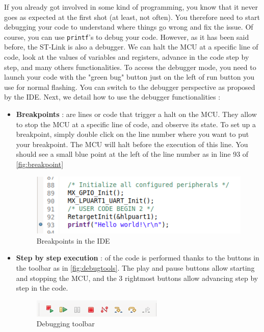 If you already got involved in some kind of programming, you know that it never goes as expected at the first shot (at least, not often). You therefore need to start debugging your code to understand where things go wrong and fix the issue. Of course, you can use \texttt{printf}'s to debug your code. However, as it has been said before, the ST-Link is also a debugger. We can halt the MCU at a specific line of code, look at the values of variables and registers, advance in the code step by step, and many others functionalities. To access the debugger mode, you need to launch your code with the "green bug" button just on the left of run button you use for normal flashing. You can switch to the debugger perspective as proposed by the IDE.
Next, we detail how to use the debugger functionalities :
\begin{itemize}
    \item \textbf{Breakpoints} : are lines or code that trigger a halt on the MCU. They allow to stop the MCU at a specific line of code, and observe its state. To set up a breakpoint, simply double click on the line number where you want to put your breakpoint. The MCU will halt before the execution of this line. You should see a small blue point at the left of the line number as in line 93 of \autoref{fig:breakpoint}

    \begin{figure}[h]
    \centering
    \includegraphics[scale=0.6]{figures/breakpoint.png}
    \caption{Breakpoints in the IDE}
    \label{fig:breakpoint}
    \end{figure}

    \item \textbf{Step by step execution} : of the code is performed thanks to the buttons in the toolbar as in \autoref{fig:debugtools}. The play and pause buttons allow starting and stopping the MCU, and the 3 rightmost buttons allow advancing step by step in the code.

    \begin{figure}[h]
    \centering
    \includegraphics[scale=0.6]{figures/debugging.png}
    \caption{Debugging toolbar}
    \label{fig:debugtools}
    \end{figure}


\end{itemize}
